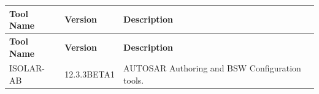 \begin{longtable}{|l|l|l|}
\hline
\begin{minipage}{0.18\linewidth}\raggedright\vspace{.75ex}\textbf{Tool Name}\vspace{.75ex}\end{minipage} & \begin{minipage}{0.18\linewidth}\raggedright\vspace{.75ex}\textbf{Version}\vspace{.75ex}\end{minipage} & \begin{minipage}{0.55\linewidth}\raggedright\vspace{.75ex}\textbf{Description}\vspace{.75ex}\end{minipage}\\
\hline\hline
\endfirsthead
\hline
\begin{minipage}{0.18\linewidth}\raggedright\vspace{.75ex}\textbf{Tool Name}\vspace{.75ex}\end{minipage} & \begin{minipage}{0.18\linewidth}\raggedright\vspace{.75ex}\textbf{Version}\vspace{.75ex}\end{minipage} & \begin{minipage}{0.55\linewidth}\raggedright\vspace{.75ex}\textbf{Description}\vspace{.75ex}\end{minipage}\\
\hline\hline
\endhead
\hline
\endfoot
\hline
\endlastfoot
\begin{minipage}{0.18\linewidth}\raggedright\vspace{.75ex}ISOLAR-AB\vspace{.75ex}\end{minipage} & \begin{minipage}{0.18\linewidth}\raggedright\vspace{.75ex}12.3.3BETA1\vspace{.75ex}\end{minipage} & \begin{minipage}{0.55\linewidth}\raggedright\vspace{.75ex}AUTOSAR Authoring and BSW Configuration tools.\vspace{.75ex}\end{minipage}\\\hline

\end{longtable}
